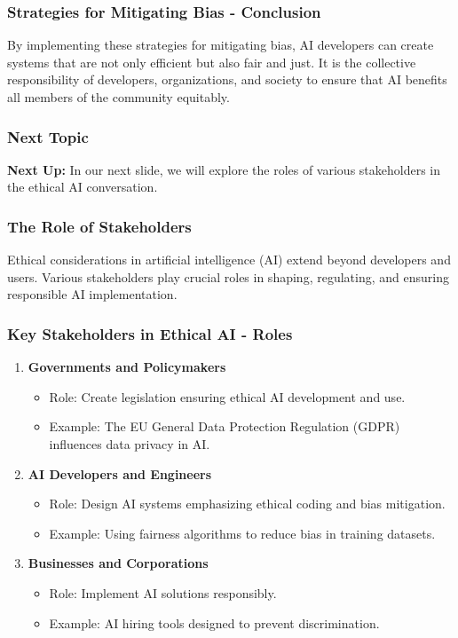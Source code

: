 \documentclass{beamer}
\begin{document}
\begin{frame}[fragile]
    \frametitle{Strategies for Mitigating Bias - Conclusion}
    By implementing these strategies for mitigating bias, AI developers can create systems that are not only efficient but also fair and just. 
    It is the collective responsibility of developers, organizations, and society to ensure that AI benefits all members of the community equitably.
\end{frame}

\begin{frame}[fragile]
    \frametitle{Next Topic}
    \textbf{Next Up:} In our next slide, we will explore the roles of various stakeholders in the ethical AI conversation.
\end{frame}

\begin{frame}[fragile]
    \frametitle{The Role of Stakeholders}
    Ethical considerations in artificial intelligence (AI) extend beyond developers and users. Various stakeholders play crucial roles in shaping, regulating, and ensuring responsible AI implementation.
\end{frame}

\begin{frame}[fragile]
    \frametitle{Key Stakeholders in Ethical AI - Roles}
    \begin{enumerate}
        \item \textbf{Governments and Policymakers}
        \begin{itemize}
            \item Role: Create legislation ensuring ethical AI development and use.
            \item Example: The EU General Data Protection Regulation (GDPR) influences data privacy in AI.
        \end{itemize}
        
        \item \textbf{AI Developers and Engineers}
        \begin{itemize}
            \item Role: Design AI systems emphasizing ethical coding and bias mitigation.
            \item Example: Using fairness algorithms to reduce bias in training datasets.
        \end{itemize}
        
        \item \textbf{Businesses and Corporations}
        \begin{itemize}
            \item Role: Implement AI solutions responsibly.
            \item Example: AI hiring tools designed to prevent discrimination.
        \end{itemize}
    \end{enumerate}
\end{frame}
\end{document}
